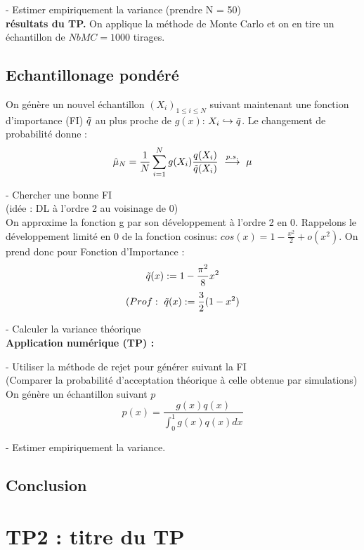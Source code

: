 \documentclass{article}
\begin{document}
- Estimer empiriquement la variance (prendre N = 50)\\
\textbf{résultats du TP.}
On applique la méthode de Monte Carlo et on en tire un échantillon de $NbMC=1000$ tirages.

\subsection{Echantillonage pondéré}
On génère un nouvel échantillon $(X_i)_{1\leq i \leq N}$ suivant maintenant une fonction d'importance (FI) $\Tilde{q}$ au plus proche de $g(x)$: $X_i \hookrightarrow \Tilde{q}$. Le changement de probabilité donne : 
$$ \hat{\mu}_N = \frac1{N} \sum_{i=1}^N g(X_i)\frac{q(X_i)}{\Tilde{q}(X_i)}\ \overset{p.s.}{\longrightarrow}\ \mu $$

- Chercher une bonne FI\\
(idée : DL à l'ordre 2 au voisinage de 0)  \\
On approxime la fonction g par son développement à l'ordre 2 en 0. Rappelons le développement limité en 0 de la fonction cosinus: 
$ cos(x) = 1 - \frac{x^2}{2} + o(x^2) $.
On prend donc pour Fonction d'Importance : 
$$\Tilde{q}(x):= 1 - \frac{\pi^2}{8} x^2$$
$$(Prof :\ \Tilde{q}(x):= \frac32(1 - x^2)$$

- Calculer la variance théorique\\
\textbf{Application numérique (TP) :}

- Utiliser la méthode de rejet pour  générer suivant la FI \\ (Comparer la probabilité d’acceptation théorique à celle obtenue par simulations)\\
On génère un échantillon suivant $p$
$$p(x) = \frac{g(x)q(x)}{\int_0^1 g(x)q(x)dx}$$

- Estimer empiriquement la variance.\\



\subsection{Conclusion}


















\newpage
\section{TP2 : titre du TP}
\end{document}
